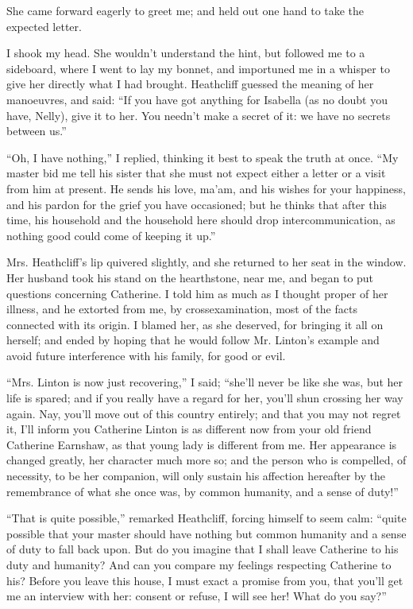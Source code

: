 \par She came forward eagerly to greet me; and held out one hand to take the expected letter.
\par I shook my head. She wouldn't understand the hint, but followed me to a sideboard, where I went to lay my bonnet, and importuned me in a whisper to give her directly what I had brought. Heathcliff guessed the meaning of her manoeuvres, and said: “If you have got anything for Isabella (as no doubt you have, Nelly), give it to her. You needn't make a secret of it: we have no secrets between us.”
\par “Oh, I have nothing,” I replied, thinking it best to speak the truth at once. “My master bid me tell his sister that she must not expect either a letter or a visit from him at present. He sends his love, ma'am, and his wishes for your happiness, and his pardon for the grief you have occasioned; but he thinks that after this time, his household and the household here should drop intercommunication, as nothing good could come of keeping it up.”
\par Mrs. Heathcliff's lip quivered slightly, and she returned to her seat in the window. Her husband took his stand on the hearthstone, near me, and began to put questions concerning Catherine. I told him as much as I thought proper of her illness, and he extorted from me, by crossexamination, most of the facts connected with its origin. I blamed her, as she deserved, for bringing it all on herself; and ended by hoping that he would follow Mr. Linton's example and avoid future interference with his family, for good or evil.
\par “Mrs. Linton is now just recovering,” I said; “she'll never be like she was, but her life is spared; and if you really have a regard for her, you'll shun crossing her way again. Nay, you'll move out of this country entirely; and that you may not regret it, I'll inform you Catherine Linton is as different now from your old friend Catherine Earnshaw, as that young lady is different from me. Her appearance is changed greatly, her character much more so; and the person who is compelled, of necessity, to be her companion, will only sustain his affection hereafter by the remembrance of what she once was, by common humanity, and a sense of duty!”
\par “That is quite possible,” remarked Heathcliff, forcing himself to seem calm: “quite possible that your master should have nothing but common humanity and a sense of duty to fall back upon. But do you imagine that I shall leave Catherine to his duty and humanity? And can you compare my feelings respecting Catherine to his? Before you leave this house, I must exact a promise from you, that you'll get me an interview with her: consent or refuse, I will see her! What do you say?”
